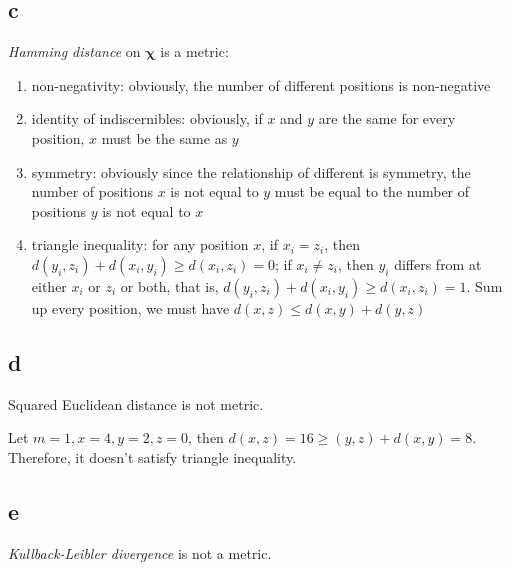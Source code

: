 \documentclass[a4paper,11pt]{article}
\theoremstyle{mytheor}
\begin{document}
\subsection*{c}
\textit{Hamming distance} on $\mathbf{\chi}$ is  a metric:
\begin{enumerate}
	\item non-negativity: obviously, the number of different positions is non-negative
	\item identity of indiscernibles: obviously, if $x$ and $y$ are the same for every position, $x$ must be the same as $y$
	\item symmetry: obviously since the relationship of different is symmetry, the number of positions $x$ is not equal to $y$ must be equal to 
	the number of positions $y$ is not equal to $x$ 
	\item triangle inequality: for any position $x$, if $x_i = z_i$, then $d(y_i,z_i) + d(x_i, y_i) \geq d(x_i, z_i) = 0$; if $x_i \neq z_i$, then
	$y_i$ differs from at either $x_i$ or $z_i$ or both, that is, $d(y_i,z_i) + d(x_i, y_i) \geq d(x_i, z_i) = 1$. Sum up every position, we must have
	$d(x,z) \leq d(x,y) + d(y,z)$
\end{enumerate}

\subsection*{d}
Squared Euclidean distance is not metric. 

Let $m = 1, x= 4, y= 2, z= 0$, then $d(x,z) = 16 \geq (y,z) + d(x,y) = 8$. Therefore, it doesn't satisfy 
triangle inequality. 


\subsection*{e}
\textit{Kullback-Leibler divergence} is not a metric. 
\end{document}
